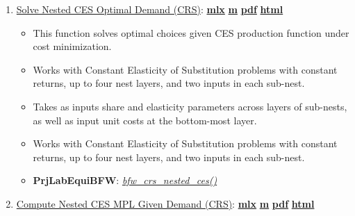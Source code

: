 \documentclass[
]{book}
\providecommand{\tightlist}{%
  \setlength{\itemsep}{0pt}\setlength{\parskip}{0pt}}
\begin{document}
\begin{enumerate}
\def\labelenumi{\arabic{enumi}.}
\tightlist
\item
  \href{https://fanwangecon.github.io/PrjLabEquiBFW/PrjLabEquiBFW/doc/solvedemand/htmlpdfm/bfwx_crs_nested_ces.html}{Solve Nested CES Optimal Demand (CRS)}: \href{https://github.com/FanWangEcon/PrjLabEquiBFW/blob/master/PrjLabEquiBFW/doc/solvedemand/bfwx_crs_nested_ces.mlx}{\textbf{mlx}} \textbar{} \href{https://github.com/FanWangEcon/PrjLabEquiBFW/blob/master/PrjLabEquiBFW/doc/solvedemand/htmlpdfm/bfwx_crs_nested_ces.m}{\textbf{m}} \textbar{} \href{https://github.com/FanWangEcon/PrjLabEquiBFW/blob/master/PrjLabEquiBFW/doc/solvedemand/htmlpdfm/bfwx_crs_nested_ces.pdf}{\textbf{pdf}} \textbar{} \href{https://fanwangecon.github.io/PrjLabEquiBFW/PrjLabEquiBFW/doc/solvedemand/htmlpdfm/bfwx_crs_nested_ces.html}{\textbf{html}}

  \begin{itemize}
  \tightlist
  \item
    This function solves optimal choices given CES production function under cost minimization.
  \item
    Works with Constant Elasticity of Substitution problems with constant returns, up to four nest layers, and two inputs in each sub-nest.
  \item
    Takes as inputs share and elasticity parameters across layers of sub-nests, as well as input unit costs at the bottom-most layer.
  \item
    Works with Constant Elasticity of Substitution problems with constant returns, up to four nest layers, and two inputs in each sub-nest.
  \item
    \textbf{PrjLabEquiBFW}: \emph{\href{https://github.com/FanWangEcon/PrjLabEquiBFW/blob/main/PrjLabEquiBFW/solvedemand/bfw_crs_nested_ces.m}{bfw\_crs\_nested\_ces()}}
  \end{itemize}
\item
  \href{https://fanwangecon.github.io/PrjLabEquiBFW/PrjLabEquiBFW/doc/solvedemand/htmlpdfm/bfwx_crs_nested_ces_mpl.html}{Compute Nested CES MPL Given Demand (CRS)}: \href{https://github.com/FanWangEcon/PrjLabEquiBFW/blob/master/PrjLabEquiBFW/doc/solvedemand/bfwx_crs_nested_ces_mpl.mlx}{\textbf{mlx}} \textbar{} \href{https://github.com/FanWangEcon/PrjLabEquiBFW/blob/master/PrjLabEquiBFW/doc/solvedemand/htmlpdfm/bfwx_crs_nested_ces_mpl.m}{\textbf{m}} \textbar{} \href{https://github.com/FanWangEcon/PrjLabEquiBFW/blob/master/PrjLabEquiBFW/doc/solvedemand/htmlpdfm/bfwx_crs_nested_ces_mpl.pdf}{\textbf{pdf}} \textbar{} \href{https://fanwangecon.github.io/PrjLabEquiBFW/PrjLabEquiBFW/doc/solvedemand/htmlpdfm/bfwx_crs_nested_ces_mpl.html}{\textbf{html}}


\end{enumerate}
\end{document}
